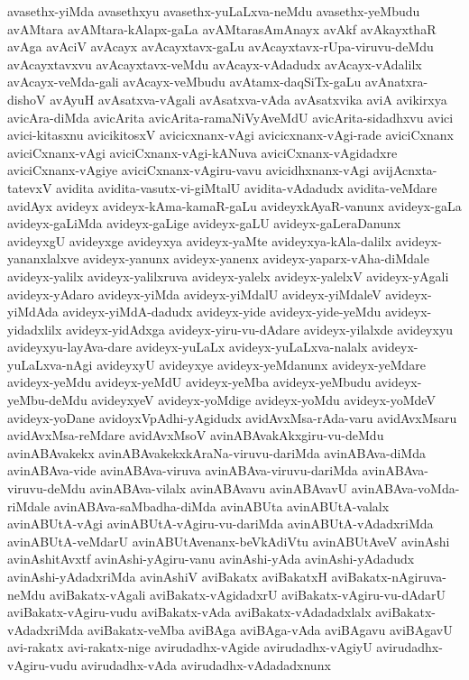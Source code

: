 {avasethx-yiMda
avasethxyu
avasethx-yuLaLxva-neMdu
avasethx-yeMbudu
avAMtara
avAMtara-kAlapx-gaLa
avAMtarasAmAnayx
avAkf
avAkayxthaR
avAga
avAciV
avAcayx
avAcayxtavx-gaLu
avAcayxtavx-rUpa-viruvu-deMdu
avAcayxtavxvu
avAcayxtavx-veMdu
avAcayx-vAdadudx
avAcayx-vAdalilx
avAcayx-veMda-gali
avAcayx-veMbudu
avAtamx-daqSiTx-gaLu
avAnatxra-dishoV
avAyuH
avAsatxva-vAgali
avAsatxva-vAda
avAsatxvika
aviA
avikirxya
avicAra-diMda
avicArita
avicArita-ramaNiVyAveMdU
avicArita-sidadhxvu
avici
avici-kitasxnu
avicikitosxV
avicicxnanx-vAgi
avicicxnanx-vAgi-rade
aviciCxnanx
aviciCxnanx-vAgi
aviciCxnanx-vAgi-kANuva
aviciCxnanx-vAgidadxre
aviciCxnanx-vAgiye
aviciCxnanx-vAgiru-vavu
avicidhxnanx-vAgi
avijAcnxta-tatevxV
avidita
avidita-vasutx-vi-giMtalU
avidita-vAdadudx
avidita-veMdare
avidAyx
avideyx
avideyx-kAma-kamaR-gaLu
avideyxkAyaR-vanunx
avideyx-gaLa
avideyx-gaLiMda
avideyx-gaLige
avideyx-gaLU
avideyx-gaLeraDanunx
avideyxgU
avideyxge
avideyxya
avideyx-yaMte
avideyxya-kAla-dalilx
avideyx-yananxlalxve
avideyx-yanunx
avideyx-yanenx
avideyx-yaparx-vAha-diMdale
avideyx-yalilx
avideyx-yalilxruva
avideyx-yalelx
avideyx-yalelxV
avideyx-yAgali
avideyx-yAdaro
avideyx-yiMda
avideyx-yiMdalU
avideyx-yiMdaleV
avideyx-yiMdAda
avideyx-yiMdA-dadudx
avideyx-yide
avideyx-yide-yeMdu
avideyx-yidadxlilx
avideyx-yidAdxga
avideyx-yiru-vu-dAdare
avideyx-yilalxde
avideyxyu
avideyxyu-layAva-dare
avideyx-yuLaLx
avideyx-yuLaLxva-nalalx
avideyx-yuLaLxva-nAgi
avideyxyU
avideyxye
avideyx-yeMdanunx
avideyx-yeMdare
avideyx-yeMdu
avideyx-yeMdU
avideyx-yeMba
avideyx-yeMbudu
avideyx-yeMbu-deMdu
avideyxyeV
avideyx-yoMdige
avideyx-yoMdu
avideyx-yoMdeV
avideyx-yoDane
avidoyxVpAdhi-yAgidudx
avidAvxMsa-rAda-varu
avidAvxMsaru
avidAvxMsa-reMdare
avidAvxMsoV
avinABAvakAkxgiru-vu-deMdu
avinABAvakekx
avinABAvakekxkAraNa-viruvu-dariMda
avinABAva-diMda
avinABAva-vide
avinABAva-viruva
avinABAva-viruvu-dariMda
avinABAva-viruvu-deMdu
avinABAva-vilalx
avinABAvavu
avinABAvavU
avinABAva-voMda-riMdale
avinABAva-saMbadha-diMda
avinABUta
avinABUtA-valalx
avinABUtA-vAgi
avinABUtA-vAgiru-vu-dariMda
avinABUtA-vAdadxriMda
avinABUtA-veMdarU
avinABUtAvenanx-beVkAdiVtu
avinABUtAveV
avinAshi
avinAshitAvxtf
avinAshi-yAgiru-vanu
avinAshi-yAda
avinAshi-yAdadudx
avinAshi-yAdadxriMda
avinAshiV
aviBakatx
aviBakatxH
aviBakatx-nAgiruva-neMdu
aviBakatx-vAgali
aviBakatx-vAgidadxrU
aviBakatx-vAgiru-vu-dAdarU
aviBakatx-vAgiru-vudu
aviBakatx-vAda
aviBakatx-vAdadadxlalx
aviBakatx-vAdadxriMda
aviBakatx-veMba
aviBAga
aviBAga-vAda
aviBAgavu
aviBAgavU
avi-rakatx
avi-rakatx-nige
avirudadhx-vAgide
avirudadhx-vAgiyU
avirudadhx-vAgiru-vudu
avirudadhx-vAda
avirudadhx-vAdadadxnunx
}
